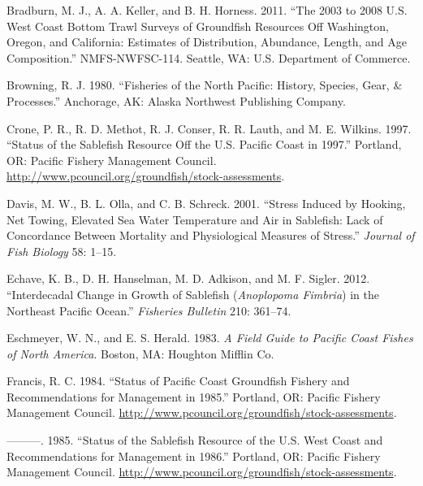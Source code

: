 \documentclass[11pt,
  english,
  a4paper,
]{article}
\begin{document}
\hypertarget{refs}{}
\begin{cslreferences}
\leavevmode\hypertarget{ref-bradburn_2003_2011}{}%
Bradburn, M. J., A. A. Keller, and B. H. Horness. 2011. ``The 2003 to 2008 U.S. West Coast Bottom Trawl Surveys of Groundfish Resources Off Washington, Oregon, and California: Estimates of Distribution, Abundance, Length, and Age Composition.'' NMFS-NWFSC-114. Seattle, WA: U.S. Department of Commerce.

\leavevmode\hypertarget{ref-browning1980}{}%
Browning, R. J. 1980. ``Fisheries of the North Pacific: History, Species, Gear, \& Processes.'' Anchorage, AK: Alaska Northwest Publishing Company.

\leavevmode\hypertarget{ref-crone1997sablefish}{}%
Crone, P. R., R. D. Methot, R. J. Conser, R. R. Lauth, and M. E. Wilkins. 1997. ``Status of the Sablefish Resource Off the U.S. Pacific Coast in 1997.'' Portland, OR: Pacific Fishery Management Council. \url{http://www.pcouncil.org/groundfish/stock-assessments}.

\leavevmode\hypertarget{ref-davis2001}{}%
Davis, M. W., B. L. Olla, and C. B. Schreck. 2001. ``Stress Induced by Hooking, Net Towing, Elevated Sea Water Temperature and Air in Sablefish: Lack of Concordance Between Mortality and Physiological Measures of Stress.'' \emph{Journal of Fish Biology} 58: 1--15.

\leavevmode\hypertarget{ref-echave2012fishbullinterdecadal}{}%
Echave, K. B., D. H. Hanselman, M. D. Adkison, and M. F. Sigler. 2012. ``Interdecadal Change in Growth of Sablefish (\emph{Anoplopoma Fimbria}) in the Northeast Pacific Ocean.'' \emph{Fisheries Bulletin} 210: 361--74.

\leavevmode\hypertarget{ref-eschmeyer1983}{}%
Eschmeyer, W. N., and E. S. Herald. 1983. \emph{A Field Guide to Pacific Coast Fishes of North America}. Boston, MA: Houghton Mifflin Co.

\leavevmode\hypertarget{ref-francis1984sablefish}{}%
Francis, R. C. 1984. ``Status of Pacific Coast Groundfish Fishery and Recommendations for Management in 1985.'' Portland, OR: Pacific Fishery Management Council. \url{http://www.pcouncil.org/groundfish/stock-assessments}.

\leavevmode\hypertarget{ref-francis1985sablefish}{}%
---------. 1985. ``Status of the Sablefish Resource of the U.S. West Coast and Recommendations for Management in 1986.'' Portland, OR: Pacific Fishery Management Council. \url{http://www.pcouncil.org/groundfish/stock-assessments}.


\end{cslreferences}
\end{document}
